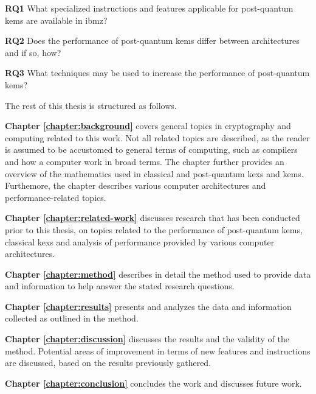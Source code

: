 \begin{description}
    \item \textbf{RQ1} What specialized instructions and features applicable for \gls{post-quantum} \acrlong{kem}s are available in \gls{ibmz}?\label{rq1}
    
    \item \textbf{RQ2} Does the performance of \gls{post-quantum} \acrlong{kem}s differ between architectures and if so, how?\label{rq2}
    
    \item \textbf{RQ3} What techniques may be used to increase the performance of \gls{post-quantum} \acrlong{kem}s?\label{rq3}
\end{description}

\noindent The rest of this thesis is structured as follows.

\begin{description}
    \item \textbf{Chapter \ref{chapter:background}} covers general topics in cryptography and computing related to this work. Not all related topics are described, as the reader is assumed to be accustomed to general terms of computing, such as compilers and how a computer work in broad terms. The chapter further provides an overview of the mathematics used in classical and \gls{post-quantum} \glspl{kex} and \glspl{kem}. Furthemore, the chapter describes various computer architectures and performance-related topics.

    \item \textbf{Chapter \ref{chapter:related-work}} discusses research that has been conducted prior to this thesis, on topics related to the performance of \gls{post-quantum} \glspl{kem}, classical \glspl{kex} and analysis of performance provided by various computer architectures.
    
    \item \textbf{Chapter \ref{chapter:method}} describes in detail the method used to provide data and information to help answer the stated research questions.
    
    \item \textbf{Chapter \ref{chapter:results}} presents and analyzes the data and information collected as outlined in the method.
    
    \item \textbf{Chapter \ref{chapter:discussion}} discusses the results and the validity of the method. Potential areas of improvement in terms of new features and instructions are discussed, based on the results previously gathered.
    
    \item \textbf{Chapter \ref{chapter:conclusion}} concludes the work and discusses future work.
\end{description}